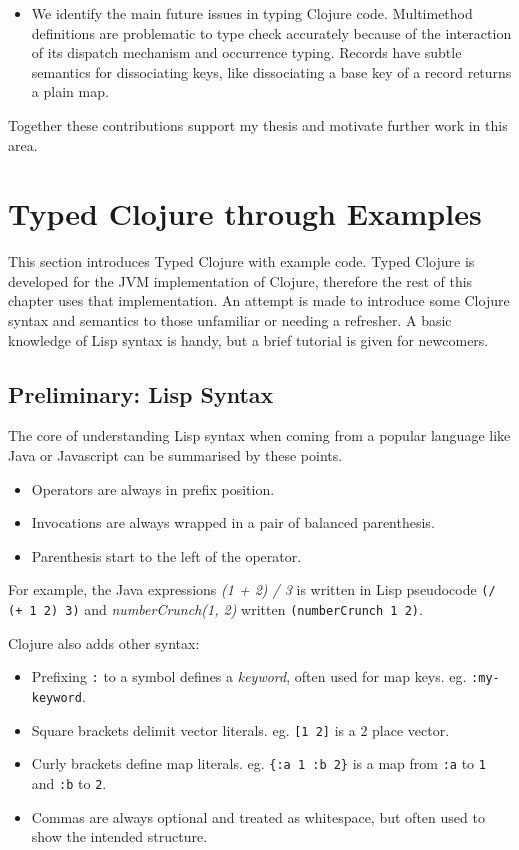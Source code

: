 \begin{itemize}
  \item We identify the main future issues in typing Clojure code. Multimethod definitions are problematic
        to type check accurately because of the interaction of its dispatch mechanism and occurrence typing.
        Records have subtle semantics for dissociating keys, like dissociating a base key of a record returns
        a plain map.
\end{itemize}

Together these contributions support my thesis and motivate further work in this area.

\section{Typed Clojure through Examples}

This section introduces Typed Clojure with example code. 
Typed Clojure is developed for the JVM implementation of Clojure, therefore
the rest of this chapter uses that implementation.
An attempt is
made to introduce some Clojure syntax and semantics to those unfamiliar or needing a refresher.
A basic knowledge of Lisp syntax is handy, but a brief tutorial is given
for newcomers.

\subsection{Preliminary: Lisp Syntax}

The core of understanding Lisp syntax when coming from a popular language
like Java or Javascript can be summarised by these points.

\begin{itemize}
  \item Operators are always in prefix position.
  \item Invocations are always wrapped in a pair of balanced parenthesis.
  \item Parenthesis start to the left of the operator.
\end{itemize}

For example, the Java expressions \emph{(1 + 2) / 3} is written in Lisp pseudocode \lstinline|(/ (+ 1 2) 3)|
and \emph{numberCrunch(1, 2)} written \lstinline|(numberCrunch 1 2)|.

Clojure also adds other syntax:

\begin{itemize}
  \item Prefixing \lstinline|:| to a symbol defines a \emph{keyword}, often used for map keys. eg. \lstinline|:my-keyword|.
  \item Square brackets delimit vector literals. eg. \lstinline|[1 2]| is a 2 place vector.
  \item Curly brackets define map literals. eg. \lstinline|{:a 1 :b 2}| is a map from 
        \lstinline|:a| to \lstinline|1| and \lstinline|:b| to \lstinline|2|.
  \item Commas are always optional and treated as whitespace, but often used to show the intended structure.
\end{itemize}

